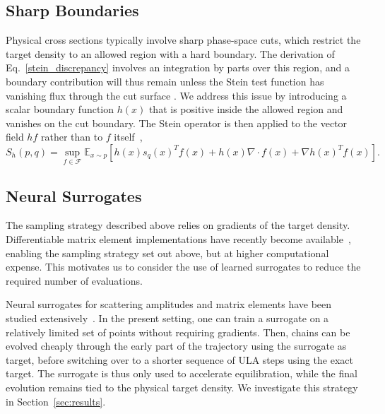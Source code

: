 \documentclass{article}
\begin{document}
\subsection{Sharp Boundaries}
\label{sharp_boundaries_section}
Physical cross sections typically involve sharp phase-space cuts, which restrict the target density to an allowed region with a hard boundary.
The derivation of Eq.~\ref{stein_discrepancy} involves an integration by parts over this region, and a boundary contribution will thus remain unless the Stein test function has vanishing flux through the cut surface \cite{liu2022estimating,williams2023approximate}.
We address this issue by introducing a scalar boundary function $h(x)$ that is positive inside the allowed region and vanishes on the cut boundary.
The Stein operator is then applied to the vector field $h f$ rather than to $f$ itself~\cite{liu2022estimating,xu2022standardisation},
\begin{equation}
  S_h(p,q) = \sup_{f \in \mathcal{F}} \mathbb{E}_{x\sim p} \left[h(x) s_q(x)^T f(x) + h(x) \nabla \cdot f(x) + \nabla h(x)^T f(x)\right].
\end{equation}

\subsection{Neural Surrogates}
The sampling strategy described above relies on gradients of the target density.
Differentiable matrix element implementations have recently become available~\cite{Heinrich:2022xfa,Carrazza:2021zug,Carrazza:2021gpx,Heimel:2024wph,Heimel:2026hgp}, enabling the sampling strategy set out above, but at higher computational expense.
This motivates us to consider the use of learned surrogates to reduce the required number of evaluations.

Neural surrogates for scattering amplitudes and matrix elements have been studied extensively~\cite{Bishara:2019iwh,Badger:2020uow,Aylett-Bullock:2021hmo,Maitre:2021uaa,Danziger:2021eeg,Badger:2022hwf,Janssen:2023ahv,Maitre:2023dqz,Bahl:2024gyt,Brehmer:2024yqw,Breso-Pla:2024pda,Herrmann:2025nnz,Bahl:2025xvx,Favaro:2025pgz,Villadamigo:2025our,Beccatini:2025tpk,Bahl:2026jvt,Bahl:2026qaf}.
In the present setting, one can train a surrogate on a relatively limited set of points without requiring gradients.
Then, chains can be evolved cheaply through the early part of the trajectory using the surrogate as target, before switching over to a shorter sequence of ULA steps using the exact target.
The surrogate is thus only used to accelerate equilibration, while the final evolution remains tied to the physical target density.
We investigate this strategy in Section~\ref{sec:results}.
\end{document}

